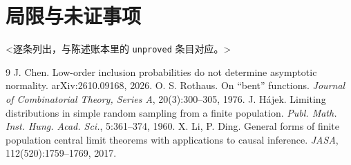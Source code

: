 \documentclass[10pt,a4paper]{article}
\theoremstyle{plain}
\theoremstyle{definition}
\begin{document}
\section{局限与未证事项}
<逐条列出，与陈述账本里的 \texttt{unproved} 条目对应。>

\begin{thebibliography}{9}
 J. Chen. Low-order inclusion probabilities do not determine asymptotic normality. arXiv:2610.09168, 2026.
 O. S. Rothaus. On ``bent'' functions. \emph{Journal of Combinatorial Theory, Series A}, 20(3):300--305, 1976.
 J. Hájek. Limiting distributions in simple random sampling from a finite population. \emph{Publ. Math. Inst. Hung. Acad. Sci.}, 5:361--374, 1960.
 X. Li, P. Ding. General forms of finite population central limit theorems with applications to causal inference. \emph{JASA}, 112(520):1759--1769, 2017.
\end{thebibliography}
\end{document}
